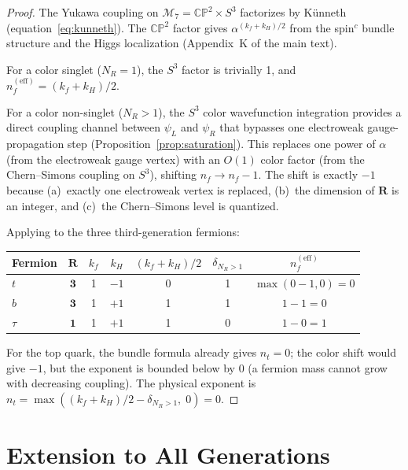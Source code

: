 \documentclass[11pt,a4paper]{article}
\newcommand{\CP}{\mathbb{CP}}
\theoremstyle{definition}
\theoremstyle{remark}
\begin{document}
\begin{proof}
The Yukawa coupling on $\mathcal{M}_7 = \CP^2 \times S^3$ factorizes
by K\"unneth (equation~\ref{eq:kunneth}).  The $\CP^2$ factor gives
$\alpha^{(k_f + k_H)/2}$ from the spin$^c$ bundle structure and the
Higgs localization (Appendix~K of the main text).

For a color singlet ($N_R = 1$), the $S^3$ factor is trivially 1,
and $n_f^{(\text{eff})} = (k_f + k_H)/2$.

For a color non-singlet ($N_R > 1$), the $S^3$ color wavefunction
integration provides a direct coupling channel between $\psi_L$ and
$\psi_R$ that bypasses one electroweak gauge-propagation step
(Proposition~\ref{prop:saturation}).  This replaces one power of
$\alpha$ (from the electroweak gauge vertex) with an $O(1)$ color
factor (from the Chern--Simons coupling on $S^3$), shifting
$n_f \to n_f - 1$.  The shift is exactly $-1$ because
(a)~exactly one electroweak vertex is replaced,
(b)~the dimension of $\mathbf{R}$ is an integer, and
(c)~the Chern--Simons level is quantized.

Applying to the three third-generation fermions:
\begin{center}
\begin{tabular}{lcccccc}
\toprule
Fermion & $\mathbf{R}$ & $k_f$ & $k_H$ &
$(k_f{+}k_H)/2$ & $\delta_{N_R>1}$ & $n_f^{(\text{eff})}$ \\
\midrule
$t$ & $\mathbf{3}$ & 1 & $-1$ & 0 & 1 &
$\max(0-1, 0) = 0$ \\
$b$ & $\mathbf{3}$ & 1 & $+1$ & 1 & 1 & $1 - 1 = 0$ \\
$\tau$ & $\mathbf{1}$ & 1 & $+1$ & 1 & 0 & $1 - 0 = 1$ \\
\bottomrule
\end{tabular}
\end{center}
For the top quark, the bundle formula already gives $n_t = 0$; the
color shift would give $-1$, but the exponent is bounded below by 0
(a fermion mass cannot grow with decreasing coupling).  The physical
exponent is $n_t = \max((k_f + k_H)/2 - \delta_{N_R > 1},\; 0) = 0$.
\end{proof}

\section{Extension to All Generations}
\label{sec:extension}
\end{document}
